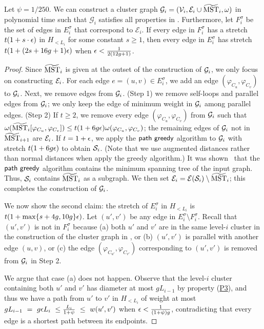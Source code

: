 \begin{lemma}\label{lm:G_i-construction}Let $\psi = 1/250$. We can construct a cluster graph 
	$\mathcal{G}_i = (\mathcal{V}_i,\mathcal{E}_i\cup \widetilde{\mathrm{MST}}_i,\omega)$ in  polynomial time 
	such that $\mathcal{G}_i$ satisfies all properties in . Furthermore, let $F^{\sigma}_i$ be the set of edges in $E^{\sigma}_i$ that correspond to $\mathcal{E}_i$. If every edge in $F^{\sigma}_i$ has a stretch $t(1+s\cdot \epsilon)$ in $H_{<L_i}$ for some constant $s\geq 1$, then every edge in $E^{\sigma}_i$ has stretch $t(1+ (2s+16g+1)\epsilon)$ when $\epsilon < \frac{1}{2(12g+1)}$.
\end{lemma}
\begin{proof} Since $\widetilde{\mathrm{MST}}_{i}$ is given  at the  outset of the construction of $\mathcal{G}_i$, we only focus on constructing $\mathcal{E}_i$. For each edge $e = (u,v) \in E^{\sigma}_i$, we add an edge $(\varphi_{C_u}, \varphi_{C_v})$ to $\mathcal{G}_i$. Next, we remove edges from $\mathcal{G}_i$. (Step 1) we remove self-loops and parallel edges from $\mathcal{G}_i$; we only keep the edge of minimum weight in $\mathcal{G}_i$ among parallel edges. (Step 2) If $t\geq 2$, we remove every edge  $(\varphi_{C_u},\varphi_{C_v})$ from $\mathcal{G}_i$ such that $\omega(\widetilde{\mathrm{MST}}_i[\varphi_{C_u},\varphi_{C_v}]) \leq t(1 + 6g\epsilon)\omega(\varphi_{C_u},\varphi_{C_v})$; the remaining edges of  $\mathcal{G}_i$ not in $\widetilde{\mathrm{MST}}_{i+1}$ are $\mathcal{E}_i$. If $t = 1+\epsilon$, we  apply the  $\mathsf{path~greedy}$ algorithm  to $\mathcal{G}_i$ with stretch $t(1 + 6g\epsilon)$ to obtain $\mathcal{S}_i$. (Note that we use augmented distances rather than normal distances when apply the greedy algorithm.) It was shown~\cite{ADDJS93} that the $\mathsf{path~greedy}$ algorithm contains the minimum spanning tree of the input graph. Thus, $\mathcal{S}_i$ contains $\widetilde{\mathrm{MST}}_{i}$ as a subgraph. We then set $\mathcal{E}_i = \mathcal{E}(\mathcal{S}_i)\setminus \widetilde{\mathrm{MST}}_{i}$; this completes the construction of $\mathcal{G}_i$.
	
	We now show  the second claim: the stretch of $E^{\sigma}_i$ in $H_{<L_i}$ is  $t(1+ \max\{s+4g,10g\}\epsilon)$. Let $(u',v')$ be any edge in $E^{\sigma}_i\setminus F^{\sigma}_i$.  Recall that  $(u',v')$ is not in $ F^{\sigma}_i$ because (a) both $u'$ and $v'$ are in the same level-$i$ cluster in the construction of the cluster graph in , or (b) $(u',v')$ is parallel with another edge $(u,v)$, or (c) the edge $(\varphi_{C_{u'}},\varphi_{C_{v'}})$ corresponding to $(u',v')$ is removed from $\mathcal{G}_i$ in Step 2. 
	
	We argue that case (a) does not happen.  Observe that the level-$i$ cluster containing both $u'$  and $v'$ has diameter at most $gL_{i-1}$ by property (\hyperlink{P3}{P3}), and thus we have a path from $u'$ to $v'$ in $H_{<L_i}$ of  weight at most $gL_{i-1} ~=~ g\epsilon L_i ~\leq \frac{L_i}{1+\psi}~\leq~w(u',v')$ when $\epsilon < \frac{1}{(1+\psi)g}$, contradicting that every edge is a shortest path between its endpoints. 
	

\end{proof}
